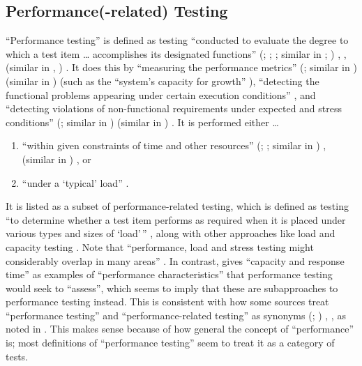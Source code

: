 \scalGraphs{}

\subsection{Performance(-related) Testing}\label{perf-test-rec}

``Performance testing'' is defined as testing ``conducted to evaluate the
degree to which a test item \dots{} accomplishes its designated functions''
\ifnotpaper
    (\citealp[p.~7]{IEEE2022}; \citeyear[p.~2]{IEEE2021a};
    \citeyear[p.~320]{IEEE2017}; similar in
    \citeyear[pp.~38\=/39]{IEEE2021c}; \citealp[p.~1187]{Moghadam2019})%
\else
    \cite[p.~320]{IEEE2017}, \cite[p.~7]{IEEE2022}, \cite[p.~2]{IEEE2021a}
    (similar in \cite[pp.~38\=/39]{IEEE2021c}, \cite[p.~1187]{Moghadam2019})%
\fi. It does this
by ``measuring the performance metrics''
\ifnotpaper
    (\citealp[p.~1187]{Moghadam2019}; similar in \citealpISTQB{})
\else
    \cite[p.~1187]{Moghadam2019} (similar in \cite{ISTQB})
\fi (such as the ``system's capacity for growth''
\citep[p.~23]{Gerrard2000b}), ``detecting the functional problems appearing
under certain execution conditions'' \citep[p.~1187]{Moghadam2019}, and
``detecting violations of non-functional requirements under expected and
stress conditions'' \ifnotpaper
    (\citealp[p.~1187]{Moghadam2019}; similar in \citealp[p.~5-9]{SWEBOK2024})%
\else
    \cite[p.~1187]{Moghadam2019} (similar in \cite[p.~5-9]{SWEBOK2024})%
\fi. It is performed either \dots\
\begin{enumerate}
    \item ``within given constraints of time and other resources''
          \ifnotpaper
              (\citealp[p.~7]{IEEE2022}; \citeyear[p.~320]{IEEE2017};
              similar in \citealp[p.~1187]{Moghadam2019})%
          \else
              \cite[p.~320]{IEEE2017}, \cite[p.~7]{IEEE2022} (similar
              in \cite[p.~1187]{Moghadam2019})%
          \fi, or
    \item ``under a `typical' load'' \citep[p.~39]{IEEE2021c}.
\end{enumerate}

It is listed as a subset of performance-related testing, which is defined as
testing ``to determine whether a test item performs as required when it is
placed under various types and sizes of `load'\,'' \citeyearpar[p.~38]{IEEE2021c},
along with other approaches like load and capacity testing
\citep[p.~22]{IEEE2022}. Note that ``performance, load and stress testing might
considerably overlap in many areas'' \citep[p.~1187]{Moghadam2019}.
In contrast, \citet[p.~5\=/9]{SWEBOK2024}
gives ``capacity and response time'' as examples of ``performance
characteristics'' that performance testing would seek to ``assess'', which
seems to imply that these are subapproaches to performance testing instead.
This is consistent with how some sources treat ``performance testing'' and
``performance-related testing'' as synonyms \ifnotpaper
    (\citealp[p.~5\=/9]{SWEBOK2024}; \citealp[p.~1187]{Moghadam2019})%
\else \cite[p.~5\=/9]{SWEBOK2024}, \cite[p.~1187]{Moghadam2019}%
\fi, as noted in \Cref{syns}. This makes sense because of how general the
concept of ``performance'' is; most definitions of ``performance testing'' seem
to treat it as a category of tests.

